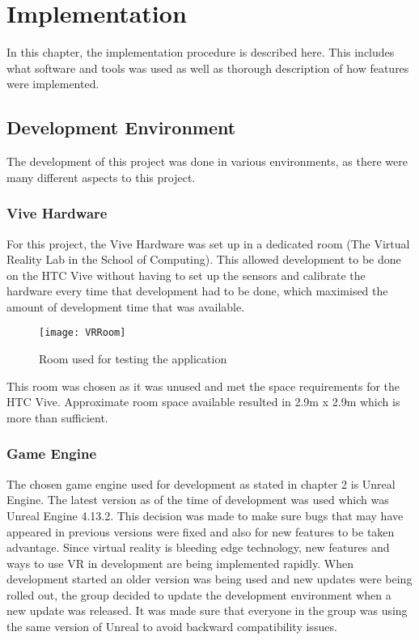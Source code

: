\chapter{Implementation}
\label{chapter6}

In this chapter, the implementation procedure is described here. This includes what software and tools was used as well as thorough description of how features were implemented.

\section{Development Environment}
The development of this project was done in various environments, as there were many different aspects to this project.

\subsection{Vive Hardware}
For this project, the Vive Hardware was set up in a dedicated room (The Virtual Reality Lab in the School of Computing). This allowed development to be done on the HTC Vive without having to set up the sensors and calibrate the hardware every time that development had to be done, which maximised the amount of development time that was available.

\begin{figure}[H]
	\texttt{[image: VRRoom]}
	\centering
	\caption{Room used for testing the application}
	\label{fig:VRRoom}
\end{figure}

This room was chosen as it was unused and met the space requirements for the HTC Vive. Approximate room space available resulted in 2.9m x 2.9m which is more than sufficient.

\subsection{Game Engine}
 The chosen game engine used for development as stated in chapter 2 is Unreal Engine. The latest version as of the time of development was used which was Unreal Engine 4.13.2. This decision was made to make sure bugs that may have appeared in previous versions were fixed and also for new features to be taken advantage. Since virtual reality is bleeding edge technology, new features and ways to use VR in development are being implemented rapidly. When development started an older version was being used and new updates were being rolled out, the group decided to update the development environment when a new update was released. It was made sure that everyone in the group was using the same version of Unreal to avoid backward compatibility issues.

